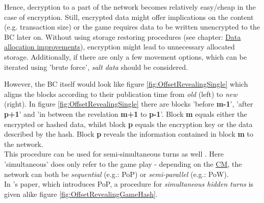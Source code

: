 Hence, decryption to a part of the network becomes relatively easy/cheap in the case of encryption.
Still, encrypted data might offer implications on the content (e.g. transaction size) or the game requires data to be written unencrypted to the \gls{BC} later on.
Without using storage restoring procedures (see chapter: \hyperref[sec:DataAllocationImprovements]{Data allocation improvements}),
encryption might lead to unnecessary allocated storage.
Additionally, if there are only a few movement options, which can be iterated using 'brute force',
\textit{salt data} \cite[597]{Morris.1979} should be considered.
\begin{figure}
\end{figure}
\noindent However, the \gls{BC} itself would look like figure \ref{fig:OffsetRevealingSingle}
which aligns the blocks according to their publication time from \textit{old} (left) to \textit{new} (right).
In figure \ref{fig:OffsetRevealingSingle} there are blocks 'before \textbf{m-1}', 'after \textbf{p+1}' and 'in between the revelation \textbf{m+1} to \textbf{p-1}'.
Block \textbf{m} equals either the encrypted or hashed data,
whilst block \textbf{p} equals the encryption key or the data described by the hash.
Block \textbf{p} reveals the information contained in block \textbf{m} to the network. \\
This procedure can be used for semi-simultaneous turns as well \cite[94]{Kraft.2016}.
Here 'simultaneous' does only refer to the game play - depending on the \hyperref[sec:ConsensusMechanisms]{CM},
the network can both be \textit{sequential} (e.g.: \gls{PoP}) or \textit{semi-parallel} (e.g.: \gls{PoW}). \\
In \citet[22]{Yuen.2019}'s paper, which introduces \gls{PoP},
a procedure for \textit{simultaneous hidden turns} is given alike figure \ref{fig:OffsetRevealingGameHash}.
